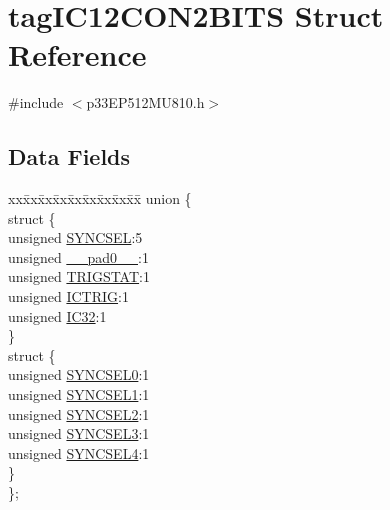 \hypertarget{structtag_i_c12_c_o_n2_b_i_t_s}{}\section{tag\+I\+C12\+C\+O\+N2\+B\+I\+TS Struct Reference}
\label{structtag_i_c12_c_o_n2_b_i_t_s}


{\ttfamily \#include $<$p33\+E\+P512\+M\+U810.\+h$>$}

\subsection*{Data Fields}
\begin{DoxyCompactItemize}
\item 
\begin{tabbing}
xx\=xx\=xx\=xx\=xx\=xx\=xx\=xx\=xx\=\kill
union \{\\
\>struct \{\\
\>\>unsigned \hyperlink{structtag_i_c12_c_o_n2_b_i_t_s_a35fbbe11485c2615ed27535b62c3fa35}{SYNCSEL}:5\\
\>\>unsigned \hyperlink{structtag_i_c12_c_o_n2_b_i_t_s_adf71f3d8410c1f1dbbc96680a92c49af}{\_\_pad0\_\_}:1\\
\>\>unsigned \hyperlink{structtag_i_c12_c_o_n2_b_i_t_s_ab379549de54ac93ad4aa73686c34cb7c}{TRIGSTAT}:1\\
\>\>unsigned \hyperlink{structtag_i_c12_c_o_n2_b_i_t_s_a79bd14cfd2e403f3a96ce0b3bb58097b}{ICTRIG}:1\\
\>\>unsigned \hyperlink{structtag_i_c12_c_o_n2_b_i_t_s_afc705120246cb4ca0c93c87817519b7f}{IC32}:1\\
\>\} \\
\>struct \{\\
\>\>unsigned \hyperlink{structtag_i_c12_c_o_n2_b_i_t_s_a3b5df3154fde5141e6ac0156425ff8b4}{SYNCSEL0}:1\\
\>\>unsigned \hyperlink{structtag_i_c12_c_o_n2_b_i_t_s_a50e73f95ab1c258ddc64f69c0991deaf}{SYNCSEL1}:1\\
\>\>unsigned \hyperlink{structtag_i_c12_c_o_n2_b_i_t_s_a304907a5d2c4cbf1114a54642a85951e}{SYNCSEL2}:1\\
\>\>unsigned \hyperlink{structtag_i_c12_c_o_n2_b_i_t_s_a6bbd1bd2ead6c9fa713969c6eb0f0c75}{SYNCSEL3}:1\\
\>\>unsigned \hyperlink{structtag_i_c12_c_o_n2_b_i_t_s_a0cd5bbe196c7974953909d27a6307bb7}{SYNCSEL4}:1\\
\>\} \\
\}; \\

\end{tabbing}\end{DoxyCompactItemize}


